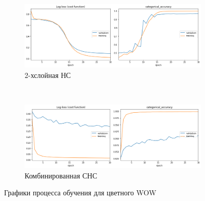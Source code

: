 \begin{figure}[p]
    \centering

    \begin{subfigure}{\textwidth}
        \includegraphics[width=\textwidth]{include/graphics/experimental_plots/color/french_wow}
                                    \caption{2-хслойная НС}
    \end{subfigure}
    ~
    \begin{subfigure}{\textwidth}
        \includegraphics[width=\textwidth]{include/graphics/experimental_plots/color/mixed_wow}
                    \caption{Комбинированная СНС}
    \end{subfigure}

    \caption{Графики процесса обучения для цветного WOW}
    \label{fig:ColorPlotsWOW}
\end{figure}

\clearpage
